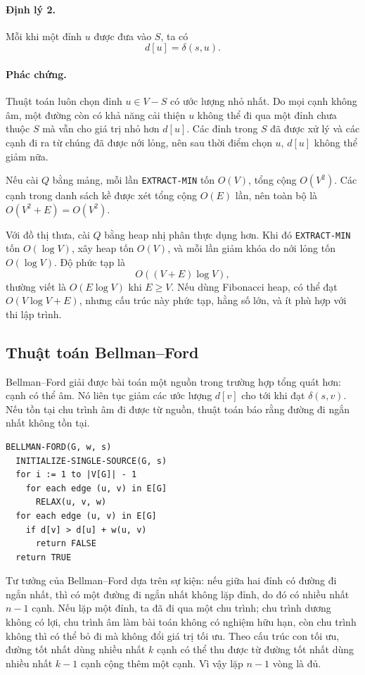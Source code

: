 \documentclass[11pt]{article}
\begin{document}
\paragraph{Định lý 2.}
Mỗi khi một đỉnh \(u\) được đưa vào \(S\), ta có
\[
  d[u]=\delta(s,u).
\]

\paragraph{Phác chứng.}
Thuật toán luôn chọn đỉnh \(u\in V-S\) có ước lượng nhỏ nhất. Do mọi cạnh
không âm, một đường còn có khả năng cải thiện \(u\) không thể đi qua một đỉnh
chưa thuộc \(S\) mà vẫn cho giá trị nhỏ hơn \(d[u]\). Các đỉnh trong \(S\) đã
được xử lý và các cạnh đi ra từ chúng đã được nới lỏng, nên sau thời điểm chọn
\(u\), \(d[u]\) không thể giảm nữa.

Nếu cài \(Q\) bằng mảng, mỗi lần \texttt{EXTRACT-MIN} tốn \(O(V)\), tổng cộng
\(O(V^2)\). Các cạnh trong danh sách kề được xét tổng cộng \(O(E)\) lần, nên
toàn bộ là \(O(V^2+E)=O(V^2)\).

Với đồ thị thưa, cài \(Q\) bằng heap nhị phân thực dụng hơn. Khi đó
\texttt{EXTRACT-MIN} tốn \(O(\log V)\), xây heap tốn \(O(V)\), và mỗi lần giảm
khóa do nới lỏng tốn \(O(\log V)\). Độ phức tạp là
\[
  O((V+E)\log V),
\]
thường viết là \(O(E\log V)\) khi \(E\ge V\). Nếu dùng Fibonacci heap, có thể
đạt \(O(V\log V+E)\), nhưng cấu trúc này phức tạp, hằng số lớn, và ít phù hợp
với thi lập trình.

\subsection{Thuật toán Bellman--Ford}

Bellman--Ford giải được bài toán một nguồn trong trường hợp tổng quát hơn:
cạnh có thể âm. Nó liên tục giảm các ước lượng \(d[v]\) cho tới khi đạt
\(\delta(s,v)\). Nếu tồn tại chu trình âm đi được từ nguồn, thuật toán báo
rằng đường đi ngắn nhất không tồn tại.

\begin{verbatim}
BELLMAN-FORD(G, w, s)
  INITIALIZE-SINGLE-SOURCE(G, s)
  for i := 1 to |V[G]| - 1
    for each edge (u, v) in E[G]
      RELAX(u, v, w)
  for each edge (u, v) in E[G]
    if d[v] > d[u] + w(u, v)
      return FALSE
  return TRUE
\end{verbatim}

Tư tưởng của Bellman--Ford dựa trên sự kiện: nếu giữa hai đỉnh có đường đi
ngắn nhất, thì có một đường đi ngắn nhất không lặp đỉnh, do đó có nhiều nhất
\(n-1\) cạnh. Nếu lặp một đỉnh, ta đã đi qua một chu trình; chu trình dương
không có lợi, chu trình âm làm bài toán không có nghiệm hữu hạn, còn chu trình
không thì có thể bỏ đi mà không đổi giá trị tối ưu. Theo cấu trúc con tối ưu,
đường tốt nhất dùng nhiều nhất \(k\) cạnh có thể thu được từ đường tốt nhất
dùng nhiều nhất \(k-1\) cạnh cộng thêm một cạnh. Vì vậy lặp \(n-1\) vòng là đủ.
\end{document}
